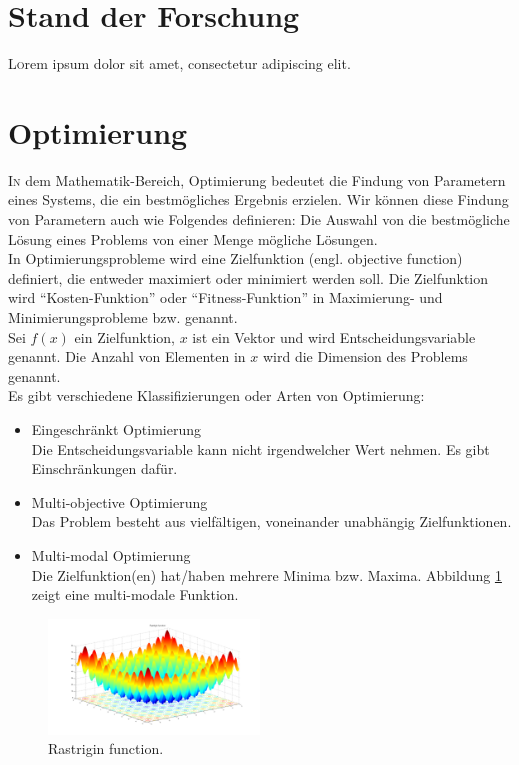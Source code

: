 \documentclass[twoside,twocolumn]{article}
\begin{document}
\section{Stand der Forschung}

\lettrine[nindent=0em,lines=3]{L} orem ipsum dolor sit amet, consectetur adipiscing elit.
\blindtext %


\section{Optimierung}

\lettrine[nindent=0em,lines=3]{I} n dem Mathematik-Bereich, Optimierung bedeutet die Findung von Parametern eines Systems, die ein bestmögliches Ergebnis erzielen. \cite{wiki_optimierung} Wir können diese Findung von Parametern auch wie Folgendes definieren: Die Auswahl von die bestmögliche Lösung eines Problems von einer Menge mögliche Lösungen.\\
In Optimierungsprobleme wird eine Zielfunktion (engl. objective function) definiert, die entweder maximiert oder minimiert werden soll. Die Zielfunktion wird ``Kosten-Funktion'' oder ``Fitness-Funktion'' in Maximierung- und Minimierungsprobleme bzw. genannt.\\
Sei $f(x)$ ein Zielfunktion, $x$ ist ein Vektor und wird Entscheidungsvariable genannt. Die Anzahl von Elementen in $x$ wird die Dimension des Problems genannt.\\
Es gibt verschiedene Klassifizierungen oder Arten von Optimierung:

\begin{itemize}
\item{Eingeschränkt Optimierung}\\
Die Entscheidungsvariable kann nicht irgendwelcher Wert nehmen. Es gibt Einschränkungen dafür.\\
\item{Multi-objective Optimierung}\\
Das Problem besteht aus vielfältigen, voneinander unabhängig Zielfunktionen.\\
\item{Multi-modal Optimierung}\\
Die Zielfunktion(en) hat/haben mehrere Minima bzw. Maxima. Abbildung \ref{fig:rastrigin} zeigt eine multi-modale Funktion.
\end{itemize}

\begin{figure}[h]
\caption{ Rastrigin function.}
\label{fig:rastrigin}
\centering
\includegraphics[width=0.5\textwidth]{../images/rastrigin_function.png}
\end{figure}
\end{document}
